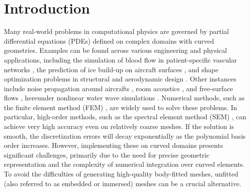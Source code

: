 \documentclass{article}
\begin{document}
\section{Introduction}\label{sec:intro}

Many real-world problems in computational physics are governed by partial differential equations (PDEs) defined on complex domains with curved geometries. Examples can be found across various engineering and physical applications, including the simulation of blood flow in patient-specific vascular networks \cite{taylor2009patient}, the prediction of ice build-up on aircraft surfaces \cite{beaugendre2003fensap}, and shape optimization problems in structural and aerodynamic design \cite{imam1982three}. Other instances include noise propagation around aircrafts \cite{tam2004computational}, room acoustics \cite{pind2019time}, and free-surface flows \cite{scardovelli1999direct}, hereunder nonlinear water wave simulations \cite{melander2025high, engsigkarup2016stabilised, visbech2025fnpf}. Numerical methods, such as the finite element method (FEM) \cite{zienkiewicz1977finite}, are widely used to solve these problems. In particular, high-order methods, such as the spectral element method (SEM) \cite{karniadakis2005spectral}, can achieve very high accuracy even on relatively coarse meshes. If the solution is smooth, the discretization errors will decay exponentially as the polynomial basis order increases. However, implementing these on curved domains presents significant challenges, primarily due to the need for precise geometric representation and the complexity of numerical integration over curved elements. To avoid the difficulties of generating high-quality body-fitted meshes, unfitted (also referred to as embedded or immersed) meshes can be a crucial alternative.
%
\end{document}
